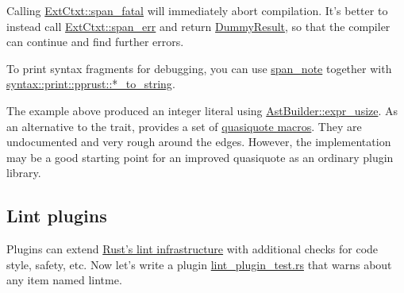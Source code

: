 \blank

Calling \href{https://doc.rust-lang.org/syntax/ext/base/struct.ExtCtxt.html\#method.span\_fatal}{ExtCtxt::span\_fatal} will 
immediately abort compilation. It's better to instead call 
\href{https://doc.rust-lang.org/syntax/ext/base/struct.ExtCtxt.html\#method.span\_err}{ExtCtxt::span\_err} and return 
\href{https://doc.rust-lang.org/syntax/ext/base/struct.DummyResult.html}{DummyResult}, so that the compiler can continue and 
find further errors.

\blank

To print syntax fragments for debugging, you can use 
\href{https://doc.rust-lang.org/syntax/ext/base/struct.ExtCtxt.html\#method.span\_note}{span\_note} together with 
\href{https://doc.rust-lang.org/syntax/print/pprust/\#functions}{syntax::print::pprust::*\_to\_string}.

\blank

The example above produced an integer literal using 
\href{https://doc.rust-lang.org/syntax/ext/build/trait.AstBuilder.html\#tymethod.expr\_usize}{AstBuilder::expr\_usize}. As 
an alternative to the  trait,  provides a set of 
\href{https://doc.rust-lang.org/syntax/ext/quote/}{quasiquote macros}. They are undocumented and very rough around the edges. 
However, the implementation may be a good starting point for an improved quasiquote as an ordinary plugin library.

\subsection*{Lint plugins}

Plugins can extend \href{https://doc.rust-lang.org/reference.html\#lint-check-attributes}{Rust's lint infrastructure} with 
additional checks for code style, safety, etc. Now let's write a plugin 
\href{https://github.com/rust-lang/rust/blob/master/src/test/auxiliary/lint\_plugin\_test.rs}{lint\_plugin\_test.rs} that warns 
about any item named lintme.


